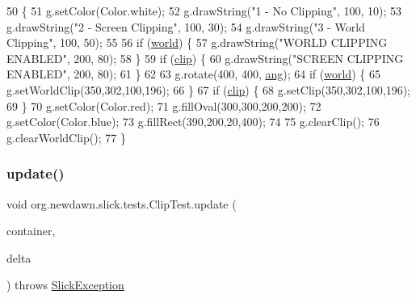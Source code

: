 \begin{DoxyCode}
50                                   \{
51         g.setColor(Color.white);
52         g.drawString(\textcolor{stringliteral}{"1 - No Clipping"}, 100, 10);
53         g.drawString(\textcolor{stringliteral}{"2 - Screen Clipping"}, 100, 30);
54         g.drawString(\textcolor{stringliteral}{"3 - World Clipping"}, 100, 50);
55         
56         \textcolor{keywordflow}{if} (\mbox{\hyperlink{classorg_1_1newdawn_1_1slick_1_1tests_1_1_clip_test_a0f781bd0db027148e91292a5e1f2343e}{world}}) \{
57             g.drawString(\textcolor{stringliteral}{"WORLD CLIPPING ENABLED"}, 200, 80);
58         \} 
59         \textcolor{keywordflow}{if} (\mbox{\hyperlink{classorg_1_1newdawn_1_1slick_1_1tests_1_1_clip_test_a598119e064382ed677267a941ed7cfba}{clip}}) \{
60             g.drawString(\textcolor{stringliteral}{"SCREEN CLIPPING ENABLED"}, 200, 80);
61         \}
62         
63         g.rotate(400, 400, \mbox{\hyperlink{classorg_1_1newdawn_1_1slick_1_1tests_1_1_clip_test_ad8fb51467f9faad1ce1cc9dbd039ceb0}{ang}});
64         \textcolor{keywordflow}{if} (\mbox{\hyperlink{classorg_1_1newdawn_1_1slick_1_1tests_1_1_clip_test_a0f781bd0db027148e91292a5e1f2343e}{world}}) \{
65             g.setWorldClip(350,302,100,196);
66         \}
67         \textcolor{keywordflow}{if} (\mbox{\hyperlink{classorg_1_1newdawn_1_1slick_1_1tests_1_1_clip_test_a598119e064382ed677267a941ed7cfba}{clip}}) \{
68             g.setClip(350,302,100,196);
69         \}
70         g.setColor(Color.red);
71         g.fillOval(300,300,200,200);
72         g.setColor(Color.blue);
73         g.fillRect(390,200,20,400);
74         
75         g.clearClip();
76         g.clearWorldClip();
77     \}
\end{DoxyCode}
\mbox{\label{classorg_1_1newdawn_1_1slick_1_1tests_1_1_clip_test_a49f3eb186c2c514c7765f39fa1f481f9}} 
\subsubsection{\texorpdfstring{update()}{update()}}
{\footnotesize\ttfamily void org.\+newdawn.\+slick.\+tests.\+Clip\+Test.\+update (\begin{DoxyParamCaption}\item[{\mbox{\hyperlink{classorg_1_1newdawn_1_1slick_1_1_game_container}{Game\+Container}}}]{container,  }\item[{int}]{delta }\end{DoxyParamCaption}) throws \mbox{\hyperlink{classorg_1_1newdawn_1_1slick_1_1_slick_exception}{Slick\+Exception}}\hspace{0.3cm}{\ttfamily [inline]}}

